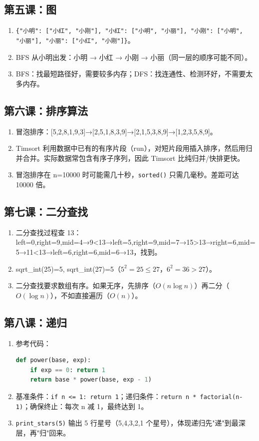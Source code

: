 \documentclass[a4paper,12pt]{ctexart}
\begin{document}
\subsection*{第五课：图}
\begin{enumerate}
  \item \texttt{\{"小明": ["小红", "小刚"], "小红": ["小明", "小丽"], "小刚": ["小明", "小丽"], "小丽": ["小红", "小刚"]\}}。
  \item BFS 从小明出发：小明 → 小红 → 小刚 → 小丽（同一层的顺序可能不同）。
  \item BFS：找最短路径好，需要较多内存；DFS：找连通性、检测环好，不需要太多内存。
\end{enumerate}

\subsection*{第六课：排序算法}
\begin{enumerate}
  \item 冒泡排序：[5,2,8,1,9,3]→[2,5,1,8,3,9]→[2,1,5,3,8,9]→[1,2,3,5,8,9]。
  \item Timsort 利用数据中已有的有序片段（run），对短片段用插入排序，然后用归并合并。实际数据常包含有序子序列，因此 Timsort 比纯归并/快排更快。
  \item 冒泡排序在 n=10000 时可能需几十秒，\texttt{sorted()} 只需几毫秒。差距可达 10000 倍。
\end{enumerate}

\subsection*{第七课：二分查找}
\begin{enumerate}
  \item 二分查找过程查 13：left=0,right=9,mid=4→9<13→left=5,right=9,mid=7→15>13→right=6,mid=5→11<13→left=6,right=6,mid=6→13，找到。
  \item sqrt\_int(25)=5, sqrt\_int(27)=5（$5^2=25 \le 27$，$6^2=36>27$）。
  \item 二分查找要求数组有序。如果无序，先排序（$O(n\log n)$）再二分（$O(\log n)$），不如直接遍历（$O(n)$）。
\end{enumerate}

\subsection*{第八课：递归}
\begin{enumerate}
  \item 参考代码：
\begin{lstlisting}[language=Python]
def power(base, exp):
    if exp == 0: return 1
    return base * power(base, exp - 1)
\end{lstlisting}
  \item 基准条件：\texttt{if n <= 1: return 1}；递归条件：\texttt{return n * factorial(n-1)}；确保终止：每次 n 减 1，最终达到 1。
  \item \texttt{print\_stars(5)} 输出 5 行星号（5,4,3,2,1 个星号），体现递归先"递"到最深层，再"归"回来。
\end{enumerate}
\end{document}
